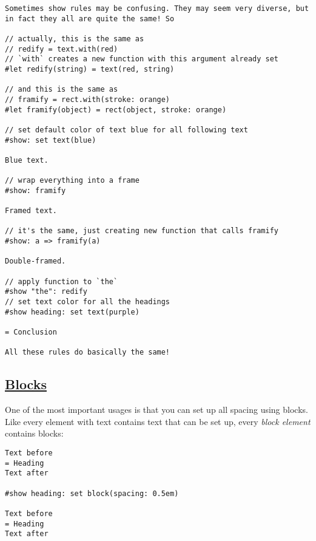 \begin{verbatim}
Sometimes show rules may be confusing. They may seem very diverse, but in fact they all are quite the same! So

// actually, this is the same as
// redify = text.with(red)
// `with` creates a new function with this argument already set
#let redify(string) = text(red, string)

// and this is the same as
// framify = rect.with(stroke: orange)
#let framify(object) = rect(object, stroke: orange)

// set default color of text blue for all following text
#show: set text(blue)

Blue text.

// wrap everything into a frame
#show: framify

Framed text.

// it's the same, just creating new function that calls framify
#show: a => framify(a)

Double-framed.

// apply function to `the`
#show "the": redify
// set text color for all the headings
#show heading: set text(purple)

= Conclusion

All these rules do basically the same!
\end{verbatim}

\pandocbounded{}

\subsection{\texorpdfstring{\hyperref[blocks]{Blocks}}{Blocks}}\label{blocks}

One of the most important usages is that you can set up all spacing
using blocks. Like every element with text contains text that can be set
up, every \emph{block element} contains blocks:

\begin{verbatim}
Text before
= Heading
Text after

#show heading: set block(spacing: 0.5em)

Text before
= Heading
Text after
\end{verbatim}

\pandocbounded{}

